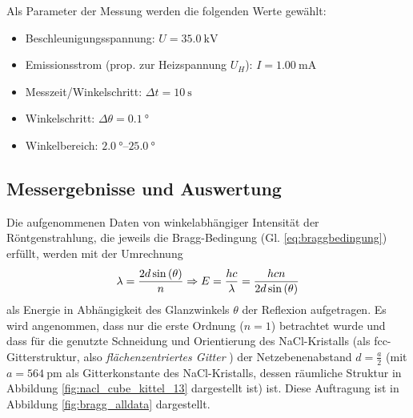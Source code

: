 Als Parameter der Messung werden die folgenden Werte gewählt\cite[4]{Versuchsanleitung428}:
\begin{itemize}
    \item Beschleunigungsspannung: $U=\SI{35,0}{\kilo\V}$
    \item Emissionsstrom (prop. zur Heizspannung $U_H$): $I=\SI{1,00}{\milli\A}$
    \item Messzeit/Winkelschritt: $\Delta t = \SI{10}{\second}$
    \item Winkelschritt: $\Delta \theta = \SI{0,1}{\degree}$
    \item Winkelbereich: $\SIrange{2,0}{25,0}{\degree}$
\end{itemize}



\subsection{Messergebnisse und Auswertung} \label{sec:bragg_auswertung}


Die aufgenommenen Daten von winkelabhängiger Intensität der Röntgenstrahlung, die jeweils die Bragg-Bedingung (Gl. \ref{eq:braggbedingung}) erfüllt, werden mit der Umrechnung \[
\lambda = \frac{2d\sin{(\theta)}}{n} \Rightarrow E = \frac{hc}{\lambda} = \frac{hcn}{2d\sin{(\theta)}}
\]
als Energie in Abhängigkeit des Glanzwinkels $\theta$ der Reflexion aufgetragen. Es wird angenommen, dass nur die erste Ordnung ($n=1$) betrachtet wurde und dass für die genutzte Schneidung und Orientierung des NaCl-Kristalls (als fcc-Gitterstruktur, also \textit{flächenzentriertes Gitter} \cite[13]{kittelsolidstate}) der Netzebenenabstand $d=\frac{a}{2}$ (mit $a=\SI{564}{\pico\meter}$ als Gitterkonstante des NaCl-Kristalls\cite{naclgitterkonst}, dessen räumliche Struktur in Abbildung \ref{fig:nacl_cube_kittel_13} dargestellt ist) ist. Diese Auftragung ist in Abbildung \ref{fig:bragg_alldata} dargestellt.



